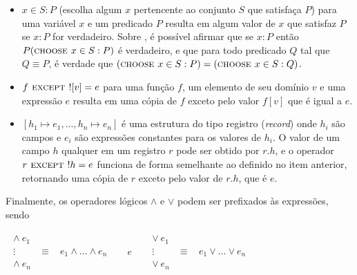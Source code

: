 \begin{itemize}

  \item \CHOOSE $x \in S : P$ (escolha algum $x$ pertencente ao conjunto $S$ que satisfaça $P$) para uma variável $x$ e um predicado $P$ resulta em algum valor de $x$ que satisfaz $P$ se \EE $x : P$ for verdadeiro. Sobre \CHOOSE, é possível afirmar que se \EE $x : P$ então $P(\textsc{choose } x \in S : P)$ é verdadeiro, e que para todo predicado $Q$ tal que $Q \equiv P$, é verdade que $(\textsc{choose } x \in S : P) = (\textsc{choose } x \in S : Q)$.

  \item $f \textsc{ except } ![v] = e$ para uma função $f$, um elemento de seu domínio $v$ e uma expressão $e$ resulta em uma cópia de $f$ exceto pelo valor $f[v]$ que é igual a $e$.

  \item $[h_1 \mapsto e_1, \dots, h_n \mapsto e_n]$ é uma estrutura do tipo registro (\textit{record}) onde $h_i$ são campos e $e_i$ são expressões constantes para os valores de $h_i$. O valor de um campo $h$ qualquer em um registro $r$ pode ser obtido por $r.h$, e o operador $r \textsc{ except } !h = e$ funciona de forma semelhante ao definido no item anterior, retornando uma cópia de $r$ exceto pelo valor de $r.h$, que é $e$.

\end{itemize}

Finalmente, os operadores lógicos $\land$ e $\lor$ podem ser prefixados às expressões, sendo

\begin{center}
  $\begin{array}{lll}
\begin{array}{ll}
  \land\ e_1\\
  \vdots ~~~~ & \equiv ~~~~ e_1 \land \dots \land e_n\\
  \land\ e_n
\end{array} &
~~~~ e ~~~~ &
\begin{array}{ll}
  \lor\ e_1\\
  \vdots ~~~~ & \equiv ~~~~ e_1 \lor \dots \lor e_n\\
  \lor\ e_n
\end{array}
\end{array}$
\end{center}

